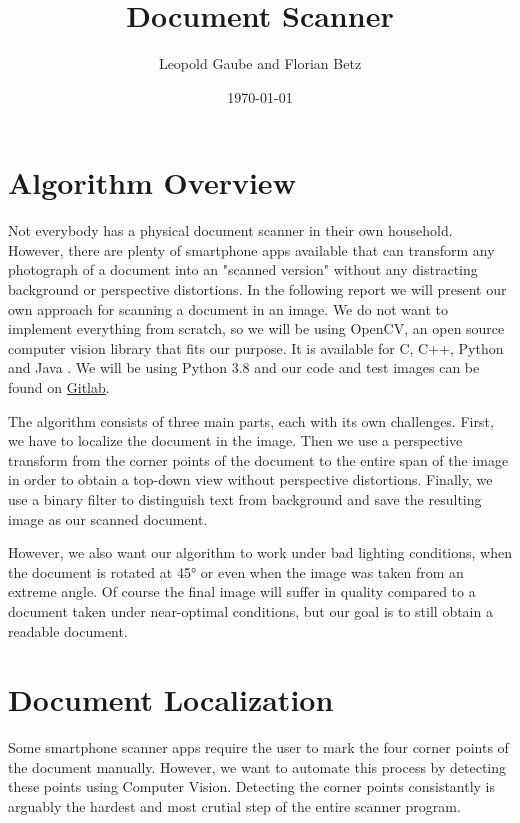 \documentclass[bibliography=totoc]{scrartcl}
\title{Document Scanner}
\author{Leopold Gaube and Florian Betz}
\date{\today}
\begin{document}
	\maketitle
	\tableofcontents

	\clearpage	

    \section{Algorithm Overview}
	Not everybody has a physical document scanner in their own household. 
	However, there are plenty of smartphone apps available that can transform any photograph of a document into an "scanned version" without any distracting background or perspective distortions.
	In the following report we will present our own approach for scanning a document in an image.
	We do not want to implement everything from scratch, so we will be using \ac{OpenCV}, an open source computer vision library that fits our purpose.	
	It is available for C, C++, Python and Java \cite{OpenCV}.
	We will be using Python 3.8 and our code and test images can be found on \hyperlink{https://gitlab.com/gaubeleo/document-scanner}{Gitlab}\cite{Gitlab}.
	
	The algorithm consists of three main parts, each with its own challenges.
	First, we have to localize the document in the image. 
	Then we use a perspective transform from the corner points of the document to the entire span of the image in order to obtain a top-down view without perspective distortions.
	Finally, we use a binary filter to distinguish text from background and save the resulting image as our scanned document.

	However, we also want our algorithm to work under bad lighting conditions, when the document is rotated at 45° or even when the image was taken from an extreme angle.
	Of course the final image will suffer in quality compared to a document taken under near-optimal conditions, but our goal is to still obtain a readable document.
	
	\section{Document Localization}
	Some smartphone scanner apps require the user to mark the four corner points of the document manually. 
	However, we want to automate this process by detecting these points using Computer Vision.
	Detecting the corner points consistantly is arguably the hardest and most crutial step of the entire scanner program. 
	
\end{document}
